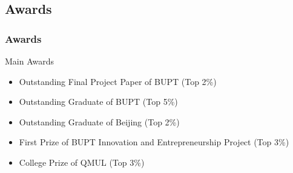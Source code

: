 \subsection{Awards}
\begin{frame}
\frametitle{Awards}

\begin{block}{Main Awards}
\begin{itemize}
  \small
  \item Outstanding Final Project Paper of BUPT (Top 2\%)
  \item Outstanding Graduate of BUPT (Top 5\%)
  \item Outstanding Graduate of Beijing (Top 2\%)
  \item First Prize of BUPT Innovation and Entrepreneurship Project (Top 3\%)
  \item College Prize of QMUL (Top 3\%)
\end{itemize}

\end{block}

\end{frame}